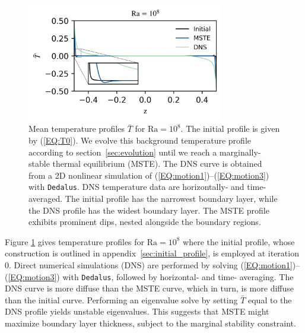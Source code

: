 \documentclass[reprint,amsmath,amssymb,aps]{revtex4-1}
\newcommand\Ra{\mathrm{Ra}}
\newcommand{\eq}[1]{(\ref{#1})}
\newcommand{\eqss}[2]{(\ref{#1})--(\ref{#2})}
\begin{document}
\begin{figure}
    \centering
    \includegraphics[width=3.4in]{T_profs_na.png}
    \caption{Mean temperature profiles $\bar{T}$ for $\Ra = 10^8$. 
    The initial profile is given by \eq{EQ:T0}. 
    We evolve this background temperature profile according to section~\ref{sec:evolution} until we reach a marginally-stable thermal equilibrium (MSTE).
    The DNS curve is obtained from a 2D nonlinear simulation of \eqss{EQ:motion1}{EQ:motion3} with \texttt{Dedalus}.
    DNS temperature data are horizontally- and time-averaged.
    The initial profile has the narrowest boundary layer, while the DNS profile has the widest boundary layer.
    The MSTE profile exhibits prominent dips, nested alongside the boundary regions. }
    \label{fig:T0_profiles}
\end{figure}

Figure \ref{fig:T0_profiles} gives temperature profiles for $\Ra = 10^8$ where the initial profile, whose construction is outlined in appendix~\ref{sec:initial_profile}, is employed at iteration 0. 
Direct numerical simulations (DNS) are performed by solving \eqss{EQ:motion1}{EQ:motion3} with \texttt{Dedalus}, followed by horizontal- and time- averaging. 
The DNS curve is more diffuse than the MSTE curve, which in turn, is more diffuse than the initial curve. 
Performing an eigenvalue solve by setting $\bar{T}$ equal to the DNS profile yields unstable eigenvalues. 
This suggests that MSTE might maximize boundary layer thickness, subject to the marginal stability constraint.
\end{document}
